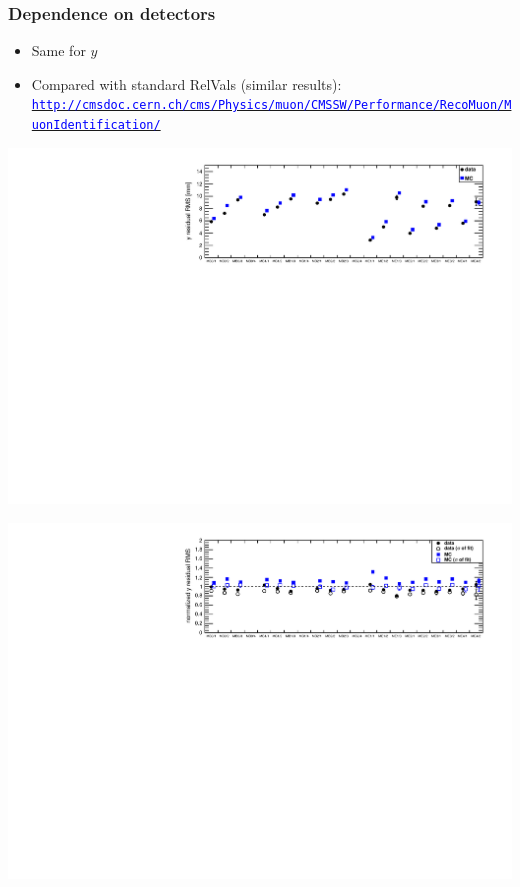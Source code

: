 \documentclass[compress]{beamer}
\begin{document}
\begin{frame}
\frametitle{Dependence on detectors}

\begin{itemize}
\item Same for $y$
\item Compared with standard RelVals (similar results):
\href{http://cmsdoc.cern.ch/cms/Physics/muon/CMSSW/Performance/RecoMuon/MuonIdentification/}{\textcolor{blue}{\tt \tiny http://cmsdoc.cern.ch/cms/Physics/muon/CMSSW/Performance/RecoMuon/MuonIdentification/}}
\end{itemize}
\begin{center}
\includegraphics[width=0.9\linewidth]{summaryY.pdf}

\includegraphics[width=0.9\linewidth]{summaryYnorm.pdf}
\end{center}
\end{frame}
\end{document}
